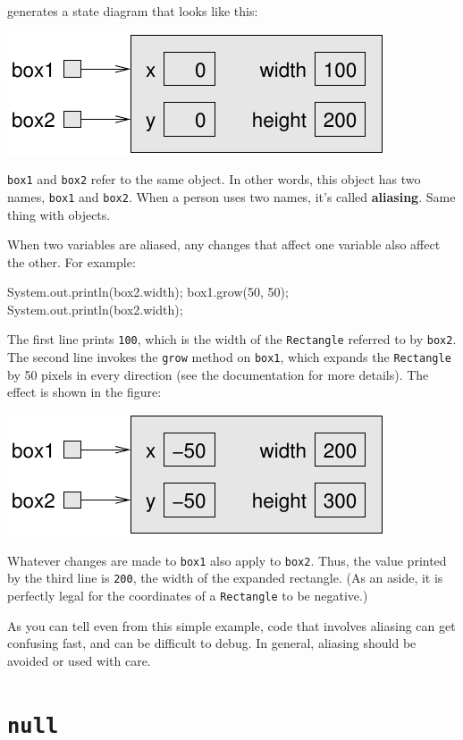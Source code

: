 generates a state diagram that looks like this:


\includegraphics{figs/aliasing.pdf}


{\tt box1} and {\tt box2} refer to the same object.
In other words, this object has two names, {\tt box1} and {\tt box2}.
When a person uses two names, it's called {\bf aliasing}.  Same thing
with objects.

When two variables are aliased, any changes that affect one
variable also affect the other.  For example:

\begin{code}
    System.out.println(box2.width);
    box1.grow(50, 50);
    System.out.println(box2.width);
\end{code}

The first line prints {\tt 100}, which is the width of the
{\tt Rectangle} referred to by {\tt box2}.  The second
line invokes the {\tt grow} method on {\tt box1}, which
expands the {\tt Rectangle} by 50 pixels in every direction
(see the documentation for more details).  The effect
is shown in the figure:


\includegraphics{figs/aliasing2.pdf}


Whatever changes are
made to {\tt box1} also apply to {\tt box2}.  Thus, the
value printed by the third line is {\tt 200}, the width of
the expanded rectangle. (As an aside, it is perfectly legal
for the coordinates of a {\tt Rectangle} to be negative.)

As you can tell even from this simple example, code that
involves aliasing can get confusing fast, and can be
difficult to debug.  In general, aliasing should be avoided
or used with care.


\section{{\tt null}}

